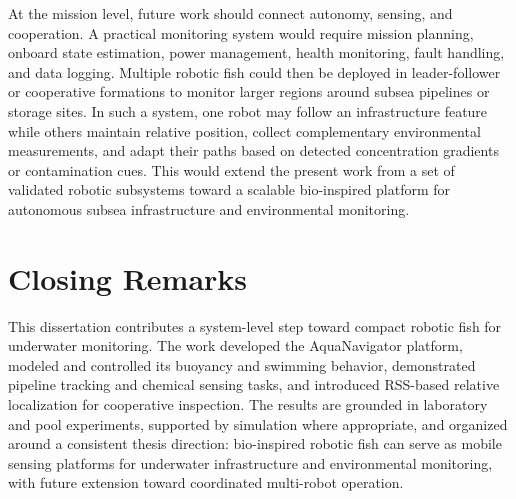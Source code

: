 \documentclass{uhcoethesis}
\begin{document}
At the mission level, future work should connect autonomy, sensing, and cooperation. A practical monitoring system would require mission planning, onboard state estimation, power management, health monitoring, fault handling, and data logging. Multiple robotic fish could then be deployed in leader-follower or cooperative formations to monitor larger regions around subsea pipelines or storage sites. In such a system, one robot may follow an infrastructure feature while others maintain relative position, collect complementary environmental measurements, and adapt their paths based on detected concentration gradients or contamination cues. This would extend the present work from a set of validated robotic subsystems toward a scalable bio-inspired platform for autonomous subsea infrastructure and environmental monitoring.

\section{Closing Remarks}

This dissertation contributes a system-level step toward compact robotic fish for underwater monitoring. The work developed the AquaNavigator platform, modeled and controlled its buoyancy and swimming behavior, demonstrated pipeline tracking and chemical sensing tasks, and introduced RSS-based relative localization for cooperative inspection. The results are grounded in laboratory and pool experiments, supported by simulation where appropriate, and organized around a consistent thesis direction: bio-inspired robotic fish can serve as mobile sensing platforms for underwater infrastructure and environmental monitoring, with future extension toward coordinated multi-robot operation.

\backmatter



\end{document}
